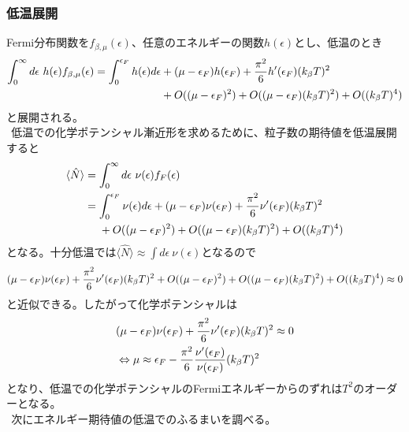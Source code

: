 \documentclass{jsarticle}  %
\numberwithin{equation}{section} %
\numberwithin{figure}{section}
\begin{document}
\subsubsection{低温展開}
    Fermi分布関数を$f_{\beta,\mu} (\epsilon)$、任意のエネルギーの関数$h (\epsilon)$とし、低温のとき
    \begin{align}
        \int_0^{\infty} d\epsilon\ h(\epsilon) f_{\beta,\mu} (\epsilon) = \int_0^{\epsilon_F} h(\epsilon) d\epsilon &+ (\mu - \epsilon_F)h(\epsilon_F) + \frac{\pi^2}{6} h'(\epsilon_F)(k_\beta T)^2 \notag \\
        &+ O((\mu - \epsilon_F)^2) +O((\mu - \epsilon_F)(k_\beta T)^2) + O((k_\beta T)^4)
    \end{align}
    と展開される。\\
    $\ \ $低温での化学ポテンシャル漸近形を求めるために、粒子数の期待値を低温展開すると
    \begin{align}
        \langle \hat{N} \rangle &= \int_0^{\infty} d\epsilon\ \nu (\epsilon) f_F(\epsilon) \notag \\
        &= \int_0^{\epsilon_F} \nu (\epsilon) d\epsilon + (\mu - \epsilon_F)\nu(\epsilon_F) + \frac{\pi^2}{6} \nu'(\epsilon_F)(k_\beta T)^2 \notag \\
        &\ \ \ \ + O((\mu - \epsilon_F)^2) +O((\mu - \epsilon_F)(k_\beta T)^2) + O((k_\beta T)^4) \notag 
    \end{align}
    となる。十分低温では$\langle \hat{N} \rangle \approx \int d\epsilon\ \nu(\epsilon)$となるので
    \begin{align}
        (\mu - \epsilon_F)\nu(\epsilon_F) + \frac{\pi^2}{6} \nu'(\epsilon_F)(k_\beta T)^2 + O((\mu - \epsilon_F)^2) +O((\mu - \epsilon_F)(k_\beta T)^2) + O((k_\beta T)^4) \approx 0\notag 
    \end{align}
    と近似できる。したがって化学ポテンシャルは
    \begin{align}
        &(\mu - \epsilon_F)\nu(\epsilon_F) + \frac{\pi^2}{6} \nu'(\epsilon_F)(k_\beta T)^2 \approx 0\notag \\
        &\Leftrightarrow \mu \approx \epsilon_F - \frac{\pi^2}{6} \frac{\nu'(\epsilon_F)}{\nu(\epsilon_F)}(k_\beta T)^2
    \end{align}
    となり、低温での化学ポテンシャルのFermiエネルギーからのずれは$T^2$のオーダーとなる。\\
    $\ \ $次にエネルギー期待値の低温でのふるまいを調べる。
\end{document}
